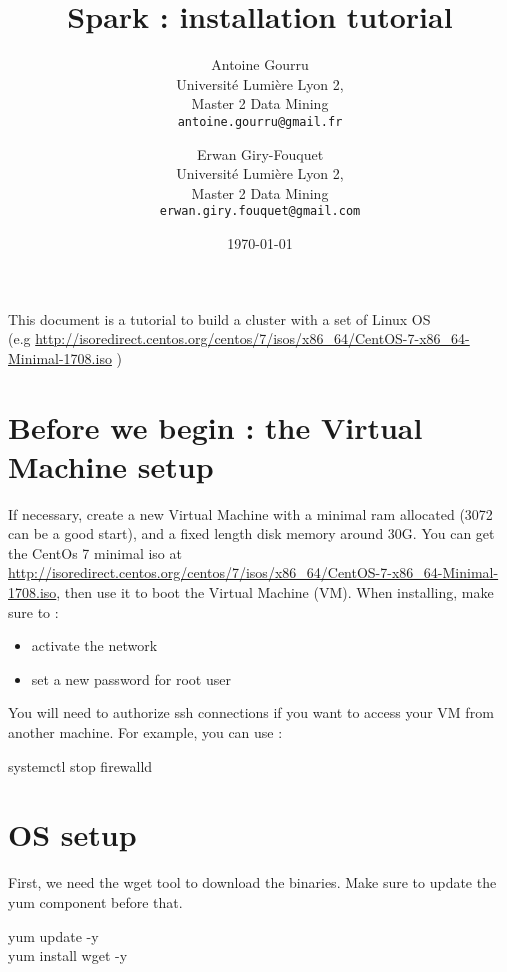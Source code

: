 \documentclass[a4paper]{article}
\begin{document}

\title{Spark : installation tutorial}
\author{Antoine Gourru\\
   Université Lumière Lyon 2,\\
   Master 2 Data Mining\\ 			  \texttt{antoine.gourru@gmail.fr}
   \and
 Erwan Giry-Fouquet\\
   Université Lumière Lyon 2,\\
   Master 2 Data Mining\\ 			  \texttt{erwan.giry.fouquet@gmail.com}
}
\date{\today}
\maketitle
This document is a tutorial to build a cluster with a set of Linux OS
\\(e.g \url{http://isoredirect.centos.org/centos/7/isos/x86_64/CentOS-7-x86_64-Minimal-1708.iso} )

\tableofcontents

\newpage
\section{Before we begin : the Virtual Machine setup}
If necessary, create a new Virtual Machine with a minimal ram allocated (3072 can be a good start), and a fixed length disk memory around 30G. You can get the CentOs 7 minimal iso at \url{http://isoredirect.centos.org/centos/7/isos/x86_64/CentOS-7-x86_64-Minimal-1708.iso}, then use it to boot the Virtual Machine (VM). When installing, make sure to :
\begin{itemize}
\item activate the network
\item set a new password for root user
\end{itemize}
You will need to authorize ssh connections if you want to access your VM from another machine. For example, you can use :
\begin{center}
\begin{tcolorbox}[width=.8\linewidth,colframe=black!5!white]
systemctl stop firewalld
\end{tcolorbox}
\end{center}


\section{OS setup}

First, we need the wget tool to download the binaries.  Make sure to update the yum component before that.
\begin{center}
\begin{tcolorbox}[width=.8\linewidth,colframe=black!5!white]
yum update -y
\\ yum install wget -y
\end{tcolorbox}
\end{center}
\end{document}
